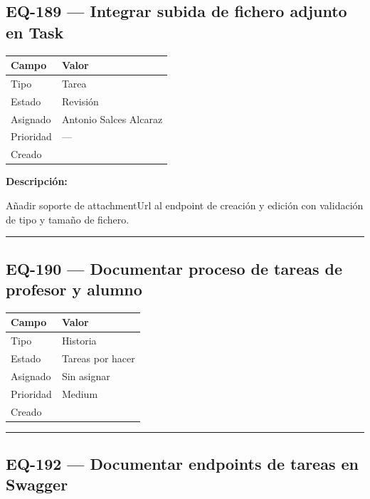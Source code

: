 \documentclass[
  spanish,
  11pt,
]{report}
\newcounter{none} %
\begin{document}
\subsection{EQ-189 --- Integrar subida de fichero adjunto en
Task}\label{eq-189-integrar-subida-de-fichero-adjunto-en-task}

{\def\LTcaptype{none} %
\begin{longtable}[]{@{}ll@{}}
\toprule\noalign{}
Campo & Valor \\
\midrule\noalign{}
\endhead
\bottomrule\noalign{}
\endlastfoot
Tipo & Tarea \\
Estado & Revisión \\
Asignado & Antonio Salces Alcaraz \\
Prioridad & --- \\
Creado & \\
\end{longtable}
}

\textbf{Descripción:}

Añadir soporte de attachmentUrl al endpoint de creación y edición con
validación de tipo y tamaño de fichero.

\begin{center}\rule{0.5\linewidth}{0.5pt}\end{center}

\subsection{EQ-190 --- Documentar proceso de tareas de profesor y
alumno}\label{eq-190-documentar-proceso-de-tareas-de-profesor-y-alumno}

{\def\LTcaptype{none} %
\begin{longtable}[]{@{}ll@{}}
\toprule\noalign{}
Campo & Valor \\
\midrule\noalign{}
\endhead
\bottomrule\noalign{}
\endlastfoot
Tipo & Historia \\
Estado & Tareas por hacer \\
Asignado & Sin asignar \\
Prioridad & Medium \\
Creado & \\
\end{longtable}
}

\begin{center}\rule{0.5\linewidth}{0.5pt}\end{center}

\subsection{EQ-192 --- Documentar endpoints de tareas en
Swagger}\label{eq-192-documentar-endpoints-de-tareas-en-swagger}
\end{document}
